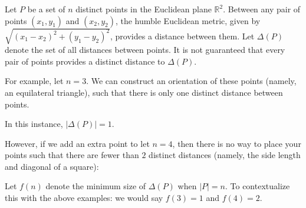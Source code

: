 \documentclass{scrippsthesisclass}
\theoremstyle{definition}
\begin{document}
Let $P$ be a set of $n$ distinct points in the Euclidean plane $\mathbb{R}^2$. 
Between any pair of points $(x_1, y_1)$ and $(x_2, y_2)$, the humble Euclidean metric, given by $\sqrt{(x_1 -x_2)^2 + (y_1 - y_2)^2}$, provides a distance between them. 
Let $\Delta(P)$ denote the set of all distances between points.
It is not guaranteed that every pair of points provides a distinct distance to $\Delta(P)$. 


For example, let $n = 3$. 
We can construct an orientation of these points (namely, an equilateral triangle), such that there is only one distinct distance between points. 
\begin{center}
\end{center}

In this instance, $|\Delta(P)| = 1$. 

However, if we add an extra point to let $n = 4$, then there is no way to place your points such that there are fewer than $2$ distinct distances (namely, the side length and diagonal of a square): 

\begin{center}
\end{center}
Let $f(n)$ denote the minimum size of $\Delta(P)$ when $|P| = n$. 
To contextualize this with the above examples: we would say $f(3) = 1$ and $f(4) = 2$. 
\end{document}
